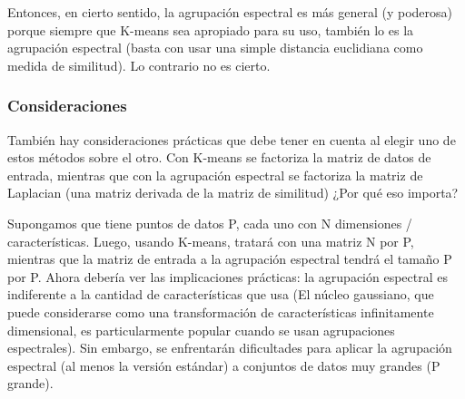 \documentclass[11pt]{article}
\begin{document}
Entonces, en cierto sentido, la agrupación espectral es más general (y
poderosa) porque siempre que K-means sea apropiado para su uso, también
lo es la agrupación espectral (basta con usar una simple distancia
euclidiana como medida de similitud). Lo contrario no es cierto.

\subsubsection{Consideraciones}\label{consideraciones}

También hay consideraciones prácticas que debe tener en cuenta al elegir
uno de estos métodos sobre el otro. Con K-means se factoriza la matriz
de datos de entrada, mientras que con la agrupación espectral se
factoriza la matriz de Laplacian (una matriz derivada de la matriz de
similitud) ¿Por qué eso importa?

Supongamos que tiene puntos de datos P, cada uno con N dimensiones /
características. Luego, usando K-means, tratará con una matriz N por P,
mientras que la matriz de entrada a la agrupación espectral tendrá el
tamaño P por P. Ahora debería ver las implicaciones prácticas: la
agrupación espectral es indiferente a la cantidad de características que
usa (El núcleo gaussiano, que puede considerarse como una transformación
de características infinitamente dimensional, es particularmente popular
cuando se usan agrupaciones espectrales). Sin embargo, se enfrentarán
dificultades para aplicar la agrupación espectral (al menos la versión
estándar) a conjuntos de datos muy grandes (P grande).
\end{document}
